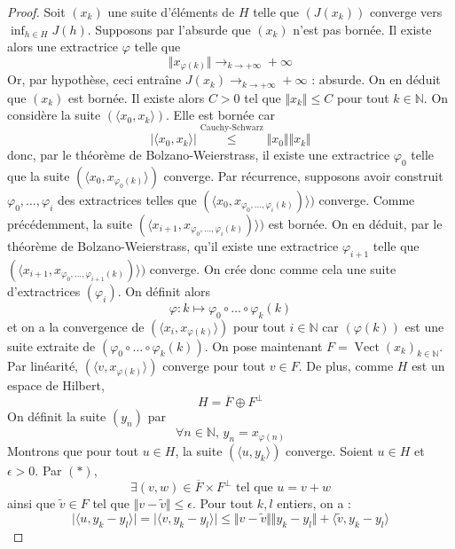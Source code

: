   \begin{proof}
    Soit $(x_k)$ une suite d'éléments de $H$ telle que $(J(x_k))$ converge vers $\inf_{h \in H} J(h)$. Supposons par l'absurde que $(x_k)$ n'est pas bornée. Il existe alors une extractrice $\varphi$ telle que
    \[ \Vert x_{\varphi(k)} \Vert \longrightarrow_{k \rightarrow +\infty} +\infty \]
    Or, par hypothèse, ceci entraîne $J(x_k) \longrightarrow_{k \rightarrow +\infty} +\infty$ : absurde. On en déduit que $(x_k)$ est bornée. Il existe alors $C > 0$ tel que $\Vert x_k \Vert \leq C$ pour tout $k \in \mathbb{N}$. On considère la suite $(\langle x_0, x_k \rangle)$. Elle est bornée car
    \[ \vert \langle x_0, x_k \rangle \vert \overset{\text{Cauchy-Schwarz}}{\leq} \Vert x_0 \Vert \Vert x_k \Vert \]
    donc, par le théorème de Bolzano-Weierstrass, il existe une extractrice $\varphi_0$ telle que la suite $(\langle x_0, x_{\varphi_0(k)} \rangle)$ converge. Par récurrence, supposons avoir construit $\varphi_0, \dots, \varphi_i$ des extractrices telles que $(\langle x_0, x_{\varphi_0, \dots, \varphi_i(k)}) \rangle)$ converge. Comme précédemment, la suite $(\langle x_{i+1}, x_{\varphi_0, \dots, \varphi_i(k)}) \rangle)$ est bornée. On en déduit, par le théorème de Bolzano-Weierstrass, qu'il existe une extractrice $\varphi_{i+1}$ telle que $(\langle x_{i+1}, x_{\varphi_0, \dots, \varphi_{i+1}(k)}) \rangle)$ converge. On crée donc comme cela une suite d'extractrices $(\varphi_i)$. On définit alors
    \[ \varphi : k \mapsto \varphi_0 \circ \dots \circ \varphi_k(k) \]
    et on a la convergence de $(\langle x_i, x_{\varphi(k)} \rangle)$ pour tout $i \in \mathbb{N}$ car $(\varphi(k))$ est une suite extraite de $(\varphi_0 \circ \dots \circ \varphi_k(k))$. On pose maintenant $F = \operatorname{Vect}(x_k)_{k \in \mathbb{N}}$. Par linéarité, $(\langle v, x_{\varphi(k)} \rangle)$ converge pour tout $v \in F$. De plus, comme $H$ est un espace de Hilbert,
    \[ H = \overline{F} \oplus F^{\perp} \tag{$*$} \]
    \newpar
    On définit la suite $(y_n)$ par
    \[ \forall n \in \mathbb{N}, \, y_n = x_{\varphi(n)} \]
    Montrons que pour tout $u \in H$, la suite $(\langle u, y_k \rangle)$ converge. Soient $u \in H$ et $\epsilon > 0$. Par $(*)$,
    \[ \exists (v,w) \in \overline{F} \times F^{\perp} \text{ tel que } u = v + w \]
    ainsi que $\widetilde{v} \in F$ tel que $\Vert v - \widetilde{v} \Vert \leq \epsilon$. Pour tout $k, l$ entiers, on a :
    \[ \vert \langle u, y_k - y_l \rangle \vert = \vert \langle v, y_k - y_l \rangle \vert \leq \Vert v - \widetilde{v} \Vert \Vert y_k - y_l \Vert + \langle \widetilde{v}, y_k - y_l \rangle \]

\end{proof}
